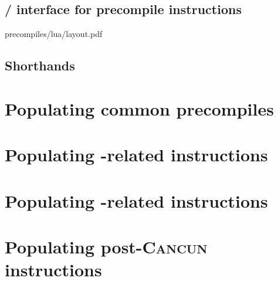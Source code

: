 \subsection{\hubMod{} / \oobMod{} interface for precompile instructions}   \label{oob: hub / oob interface for precompiles}   {precompiles/lua/layout.pdf}
\subsection{Shorthands}                                                    \label{oob: populating: shorthands}               
\section{Populating common precompiles}                                    \label{oob: populating: common precompiles}       
\section{Populating \instModexp{}-related \oobMod{} instructions}          \label{oob: populating: modexp}                   
\section{Populating \instBlake{}-related \oobMod{} instructions}           \label{oob: populating: blake2f}                  
\section{Populating post-\textsc{Cancun} \oobMod{} instructions}             \label{oob: populating: post_cancun}              
